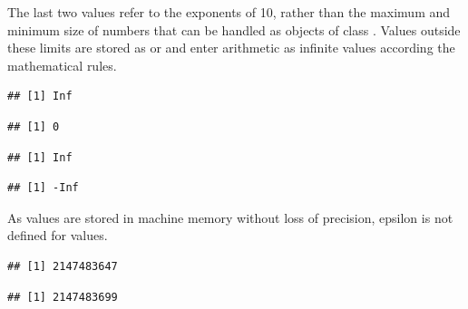 \documentclass[krantz2]{krantz}\usepackage{knitr}%
\begin{document}
\begin{explainbox}
The last two values refer to the exponents of 10, rather than the maximum and minimum size of numbers that can be handled as objects of class . Values outside these limits are stored as  or  and enter arithmetic as infinite values according the mathematical rules.

\begin{knitrout}\footnotesize
{}\color{fgcolor}\begin{kframe}
\begin{alltt}
\end{alltt}
\begin{verbatim}
## [1] Inf
\end{verbatim}
\begin{alltt}
\end{alltt}
\begin{verbatim}
## [1] 0
\end{verbatim}
\begin{alltt}
 \hlopt{+} 
\end{alltt}
\begin{verbatim}
## [1] Inf
\end{verbatim}
\begin{alltt}
\hlopt{-} \hlopt{+} 
\end{alltt}
\begin{verbatim}
## [1] -Inf
\end{verbatim}
\end{kframe}
\end{knitrout}

As  values are stored in machine memory without loss of precision, epsilon is not defined for  values.

\begin{knitrout}\footnotesize
{}\color{fgcolor}\begin{kframe}
\begin{alltt}
\hlopt{$}
\end{alltt}
\begin{verbatim}
## [1] 2147483647
\end{verbatim}
\begin{alltt}
\end{alltt}
\begin{verbatim}
## [1] 2147483699
\end{verbatim}
\end{kframe}
\end{knitrout}


\end{explainbox}
\end{document}
